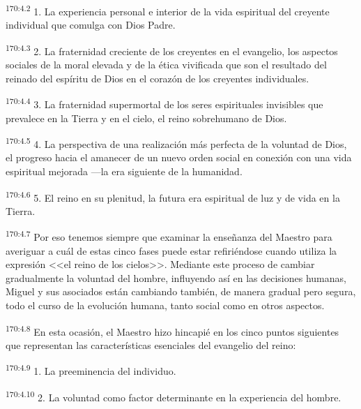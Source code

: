 \par 
\textsuperscript{170:4.2} 1. La experiencia personal e interior de la vida espiritual del creyente individual que comulga con Dios Padre.

\par 
\textsuperscript{170:4.3} 2. La fraternidad creciente de los creyentes en el evangelio, los aspectos sociales de la moral elevada y de la ética vivificada que son el resultado del reinado del espíritu de Dios en el corazón de los creyentes individuales.

\par 
\textsuperscript{170:4.4} 3. La fraternidad supermortal de los seres espirituales invisibles que prevalece en la Tierra y en el cielo, el reino sobrehumano de Dios.

\par 
\textsuperscript{170:4.5} 4. La perspectiva de una realización más perfecta de la voluntad de Dios, el progreso hacia el amanecer de un nuevo orden social en conexión con una vida espiritual mejorada ---la era siguiente de la humanidad.

\par 
\textsuperscript{170:4.6} 5. El reino en su plenitud, la futura era espiritual de luz y de vida en la Tierra.

\par 
\textsuperscript{170:4.7} Por eso tenemos siempre que examinar la enseñanza del Maestro para averiguar a cuál de estas cinco fases puede estar refiriéndose cuando utiliza la expresión <<el reino de los cielos>>. Mediante este proceso de cambiar gradualmente la voluntad del hombre, influyendo así en las decisiones humanas, Miguel y sus asociados están cambiando también, de manera gradual pero segura, todo el curso de la evolución humana, tanto social como en otros aspectos.

\par 
\textsuperscript{170:4.8} En esta ocasión, el Maestro hizo hincapié en los cinco puntos siguientes que representan las características esenciales del evangelio del reino:

\par 
\textsuperscript{170:4.9} 1. La preeminencia del individuo.

\par 
\textsuperscript{170:4.10} 2. La voluntad como factor determinante en la experiencia del hombre.

